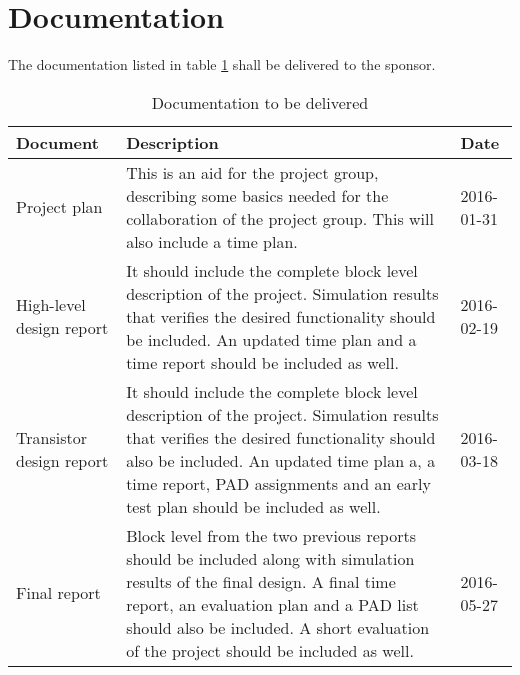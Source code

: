 \section{Documentation}
The documentation listed in table \ref{dokumentation:tabell} shall be delivered to the sponsor.

\begin{table}[H]
  \centering
  \begin{tabularx}{\textwidth}{| l | X | l |}
    \hline
    \textbf{Document} & \textbf{Description} & \textbf{Date} \\\hline
	   {Project plan} & {This is an aid for the project group, describing some basics needed for the collaboration of the project group. This will also include a time plan.} & {2016-01-31} \\\hline
	   {High-level design report} & {It should include the complete block level description of the project. Simulation results that verifies the desired functionality should be included. An updated time plan and a time report should be included as well.} & {2016-02-19} \\\hline
	   {Transistor design report} & {It should include the complete block level description of the project. Simulation results that verifies the desired functionality should also be included. An updated time plan a, a time report, PAD assignments and an early test plan should be included as well. } & {2016-03-18} \\\hline
	   {Final report} & {Block level from the two previous reports should be included along with simulation results of the final design. A final time report, an evaluation plan and a PAD list should also be included. A short evaluation of the project should be included as well.} & {2016-05-27} \\\hline
  \end{tabularx}
  \caption{Documentation to be delivered} \label{dokumentation:tabell}
\end{table}
